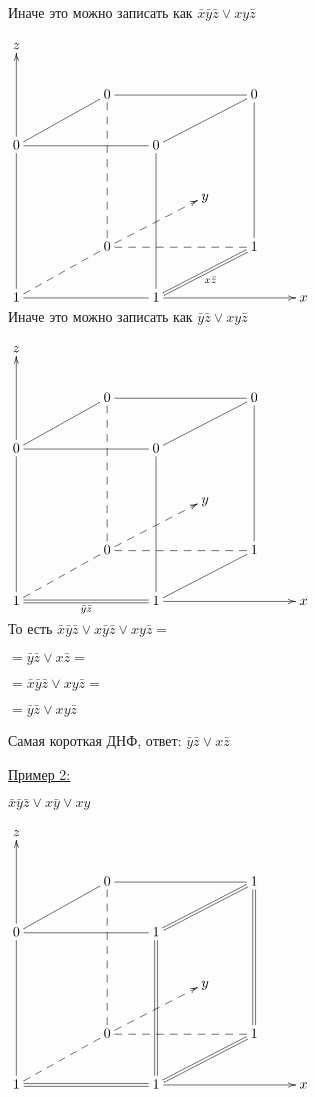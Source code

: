 \documentclass[a4paper, 12pt] {article}
\begin{document}
\newpage

Иначе это можно записать как $ \bar x \bar y \bar z \vee xy \bar z $

$ 
\begin{matrix}
	\xymatrix{
		z &   &  &   & & &\\
		&   & 0 \ar@{-}[lld] \ar@{--}[ddd] &   & & 0 \ar@{-}[lld] \ar@{-}[lll]&\\
		0 \ar@{->}[uu] \ar@{-}[rrr] &   &  & 0  & & &\\
		&   &  &   & y & &\\
		&   & 0 \ar@{--}[lld] \ar@{-->}[rru] \ar@{--}[rrr] &   & & 1 \ar@{-}[uuu]  &\\
		1  \ar@{-}[uuu] \ar@{-}[rrr] & & & 1 \ar@{->}[rrr] \ar@{-}[uuu] \ar@{=}[rru]_{x \bar z} & & & x \\
	}
\end{matrix}
$\\

Иначе это можно записать как $ \bar y \bar z \vee xy \bar z $

$ 
\begin{matrix}
	\xymatrix{
		z &   &  &   & & &\\
		&   & 0 \ar@{-}[lld] \ar@{--}[ddd] &   & & 0 \ar@{-}[lld] \ar@{-}[lll]&\\
		0 \ar@{->}[uu] \ar@{-}[rrr] &   &  & 0  & & &\\
		&   &  &   & y & &\\
		&   & 0 \ar@{--}[lld] \ar@{-->}[rru] \ar@{--}[rrr] &   & & 1 \ar@{-}[uuu]  &\\
		1  \ar@{-}[uuu] \ar@{=}[rrr]_{\bar y \bar z} & & & 1 \ar@{->}[rrr] \ar@{-}[uuu] \ar@{-}[rru] & & & x \\
	}
\end{matrix}
$\\

То есть $ \bar x \bar y \bar z \vee  x \bar y \bar z \vee  x  y \bar z = $

$ = \bar y \bar z \vee x \bar z = $

$ = \bar x \bar y \bar z \vee xy \bar z = $

$ = \bar y \bar z \vee xy \bar z$

Самая короткая ДНФ, ответ: $ \bar y \bar z \vee x \bar z $

\newpage

\underline{Пример 2:}

$ \bar x \bar y \bar z \vee  x \bar y  \vee  x  y $

$ 
\begin{matrix}
	\xymatrix{
		z &   &  &   & & &\\
		&   & 0 \ar@{-}[lld] \ar@{--}[ddd] &   & & 1 \ar@{=}[lld] \ar@{-}[lll]&\\
		0 \ar@{->}[uu] \ar@{-}[rrr] &   &  & 1  & & &\\
		&   &  &   & y & &\\
		&   & 0 \ar@{--}[lld] \ar@{-->}[rru] \ar@{--}[rrr] &   & & 1 \ar@{=}[uuu]  &\\
		1  \ar@{-}[uuu] \ar@{=}[rrr] & & & 1 \ar@{->}[rrr] \ar@{=}[uuu] \ar@{=}[rru] & & & x \\
	}
\end{matrix}
$\\
\end{document}
